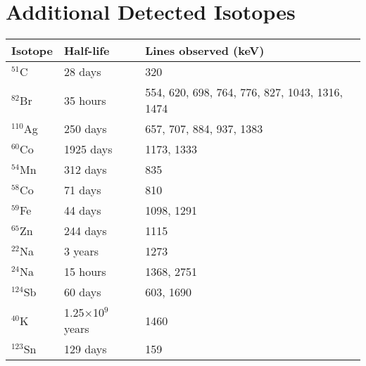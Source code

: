 \section{Additional Detected Isotopes}














\begin{center}
	\begin{tabular} { | l | l | l |}
	\hline
	\textbf{Isotope} & \textbf{Half-life} & \textbf{Lines observed (keV)} \\ \hline
	$^{51}$C & 28 days &  320 \\ \hline
	$^{82}$Br & 35 hours & 554, 620, 698, 764, 776, 827, 1043, 1316, 1474  \\ \hline
	$^{110}$Ag & 250 days & 657, 707, 884, 937, 1383 \\ \hline
	 $^{60}$Co & 1925 days & 1173, 1333 \\ \hline
	$^{54}$Mn & 312 days & 835 \\ \hline
	$^{58}$Co & 71 days & 810 \\ \hline
	$^{59}$Fe & 44 days & 1098, 1291 \\ \hline
	$^{65}$Zn & 244 days & 1115 \\ \hline
	$^{22}$Na & 3 years & 1273 \\ \hline
	$^{24}$Na & 15 hours & 1368, 2751 \\ \hline
	$^{124}$Sb & 60 days & 603, 1690 \\ \hline
	$^{40}$K & 1.25$\times$10$^9$ years & 1460 \\ \hline
	$^{123}$Sn & 129 days & 159 \\ \hline
	\end{tabular}
\end{center}



